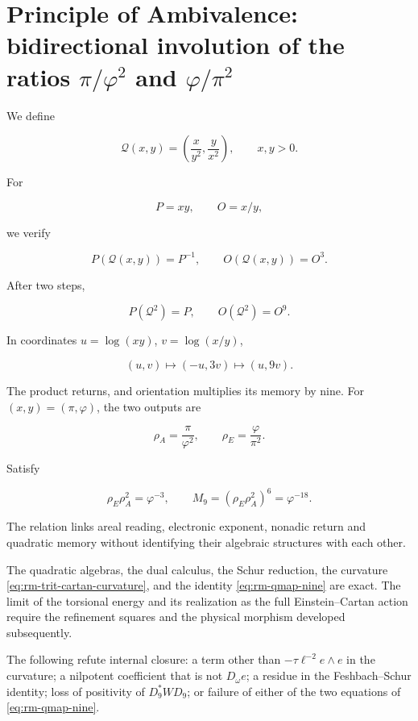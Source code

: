 \section{Principle of Ambivalence: bidirectional involution of the ratios \(\pi/\varphi^2\) and \(\varphi/\pi^2\)}

We define

\[
\mathcal Q(x,y)=\left(\frac{x}{y^2},\frac{y}{x^2}\right),
\qquad x,y>0.
\]

For

\[
P=xy,
\qquad
O=x/y,
\]

we verify

\[
P(\mathcal Q(x,y))=P^{-1},
\qquad
O(\mathcal Q(x,y))=O^3.
\]

After two steps,

\begin{equation}
\boxed{P(\mathcal Q^2)=P,
\qquad O(\mathcal Q^2)=O^9.}
\label{eq:rm-qmap-nine}
\end{equation}

In coordinates \(u=\log(xy)\), \(v=\log(x/y)\),

\[
(u,v)\longmapsto(-u,3v)\longmapsto(u,9v).
\]

The product returns, and orientation multiplies its memory by nine. For
\((x,y)=(\pi,\varphi)\), the two outputs are

\[
\rho_A=\frac{\pi}{\varphi^2},
\qquad
\rho_E=\frac{\varphi}{\pi^2}.
\]

Satisfy

\[
\rho_E\rho_A^2=\varphi^{-3},
\qquad
M_9=(\rho_E\rho_A^2)^6=\varphi^{-18}.
\]

The relation links areal reading, electronic exponent, nonadic return
and quadratic memory without identifying their algebraic structures with each other.

\begin{proofstatusbox}
The quadratic algebras, the dual calculus, the Schur reduction, the
curvature \eqref{eq:rm-trit-cartan-curvature}, and the identity
\eqref{eq:rm-qmap-nine} are exact. The limit of the torsional energy and its
realization as the full Einstein--Cartan action require the
refinement squares and the physical morphism developed subsequently.
\end{proofstatusbox}

\begin{falsifierbox}
The following refute internal closure: a term other than
\(-\tau\ell^{-2}e\wedge e\) in the curvature; a nilpotent coefficient that is not
\(D_\omega e\); a residue in the Feshbach--Schur identity; loss
of positivity of \(D_9^*WD_9\); or failure of either of the two equations
of \eqref{eq:rm-qmap-nine}.
\end{falsifierbox}
